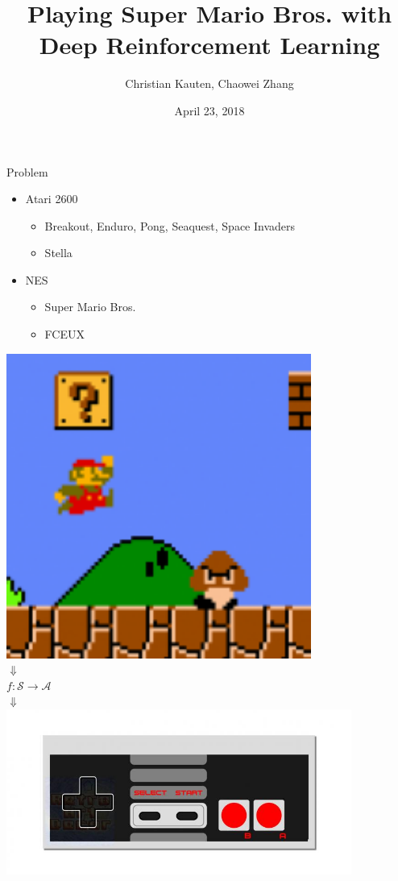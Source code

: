 \documentclass{beamer}
\title{Playing Super Mario Bros. with Deep Reinforcement Learning}
\author{Christian Kauten, Chaowei Zhang}
\institute{Auburn University}
\date{April 23, 2018}
\begin{document}
\frame{\titlepage}



\begin{frame}{Problem}
\begin{minipage}{\textwidth}
%
\begin{minipage}{0.5\textwidth}
\begin{itemize}
    \item{Atari 2600}
        \begin{itemize}
        \item{Breakout, Enduro, Pong, Seaquest, Space Invaders}
        \item{Stella}
        \end{itemize}
    \item{NES}
        \begin{itemize}
        \item{Super Mario Bros.}
        \item{FCEUX}
        \end{itemize}
\end{itemize}
\end{minipage}
%
\hfill
%
\begin{minipage}[t]{0.5\textwidth}
\centering
\includegraphics[width=0.75\textwidth]{img/smb} \\
$\Downarrow$ \\
$f : \mathcal{S} \to \mathcal{A}$ \\
$\Downarrow$ \\
\includegraphics[width=0.85\textwidth]{img/nes}
\end{minipage}
%
\end{minipage}
\end{frame}
\end{document}
